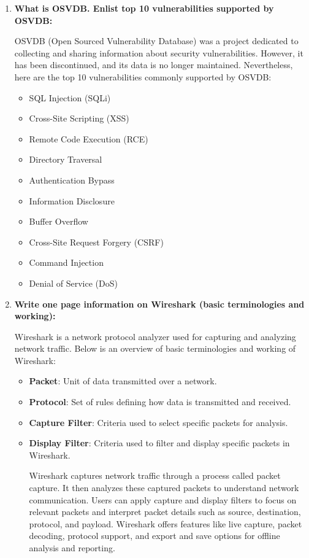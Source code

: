 \documentclass[11pt]{article}
\begin{document}
\begin{enumerate}
    \item \textbf{What is OSVDB. Enlist top 10 vulnerabilities supported by OSVDB:}

          OSVDB (Open Sourced Vulnerability Database) was a project dedicated to collecting and sharing information about security vulnerabilities. However, it has been discontinued, and its data is no longer maintained. Nevertheless, here are the top 10 vulnerabilities commonly supported by OSVDB:

          \begin{itemize}
              \item SQL Injection (SQLi)
              \item Cross-Site Scripting (XSS)
              \item Remote Code Execution (RCE)
              \item Directory Traversal
              \item Authentication Bypass
              \item Information Disclosure
              \item Buffer Overflow
              \item Cross-Site Request Forgery (CSRF)
              \item Command Injection
              \item Denial of Service (DoS)
          \end{itemize}

    \item \textbf{Write one page information on Wireshark (basic terminologies and working):}

          Wireshark is a network protocol analyzer used for capturing and analyzing network traffic. Below is an overview of basic terminologies and working of Wireshark:

          \begin{itemize}
              \item \textbf{Packet}: Unit of data transmitted over a network.
              \item \textbf{Protocol}: Set of rules defining how data is transmitted and received.
              \item \textbf{Capture Filter}: Criteria used to select specific packets for analysis.
              \item \textbf{Display Filter}: Criteria used to filter and display specific packets in Wireshark.

                    Wireshark captures network traffic through a process called packet capture. It then analyzes these captured packets to understand network communication. Users can apply capture and display filters to focus on relevant packets and interpret packet details such as source, destination, protocol, and payload. Wireshark offers features like live capture, packet decoding, protocol support, and export and save options for offline analysis and reporting.
          \end{itemize}
\end{enumerate}
\end{document}
